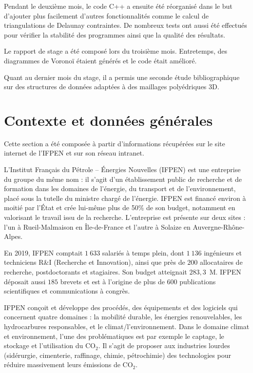 \documentclass[12pt,a4paper]{report}
\begin{document}
Pendant le deuxième mois, le code C++ a ensuite été réorganisé dans le but d'ajouter plus facilement d'autres fonctionnalités comme le calcul de triangulations de Delaunay contraintes. De nombreux tests ont aussi été effectués pour vérifier la stabilité des programmes ainsi que la qualité des résultats.

Le rapport de stage a été composé lors du troisième mois. Entretemps, des diagrammes de Voronoï étaient générés et le code était amélioré.

Quant au dernier mois du stage, il a permis une seconde étude bibliographique sur des structures de données adaptées à des maillages polyédriques 3D.

\newpage
\section{Contexte et données générales}
Cette section a été composée à partir d'informations récupérées sur le site internet de l'IFPEN et sur son réseau intranet.
\vspace{1cm}

L'Institut Français du Pétrole -- \'Energies Nouvelles (IFPEN) est une entreprise du groupe du même nom : il s'agit d'un établissement public de recherche et de formation dans les domaines de l'énergie, du transport et de l'environnement, placé sous la tutelle du ministre chargé de l'énergie. IFPEN est financé environ à moitié par l'\'Etat et crée lui-même plus de 50\% de son budget, notamment en valorisant le travail issu de la recherche. L'entreprise est présente sur deux sites : l'un à Rueil-Malmaison en \^Ile-de-France et l'autre à Solaize en Auvergne-Rhône-Alpes.

En 2019, IFPEN comptait $1\ 633$ salariés à temps plein, dont $1\ 136$ ingénieurs et techniciens R\&I (Recherche et Innovation), ainsi que près de $200$ allocataires de recherche, postdoctorants et stagiaires. Son budget atteignait $283,3$~\textrm{M}\texteuro. IFPEN déposait aussi $185$ brevets et est à l'origine de plus de $600$ publications scientifiques et communications à congrès.

IFPEN conçoit et développe des procédés, des équipements et des logiciels qui concernent quatre domaines : la mobilité durable, les énergies renouvelables, les hydrocarbures responsables, et le climat/l'environnement. Dans le domaine climat et environnement, l'une des problématiques est par exemple le captage, le stockage et l'utilisation du CO$_2$. Il s'agit de proposer aux industries lourdes (sidérurgie, cimenterie, raffinage, chimie, pétrochimie) des technologies pour réduire massivement leurs émissions de CO$_2$.
\end{document}
